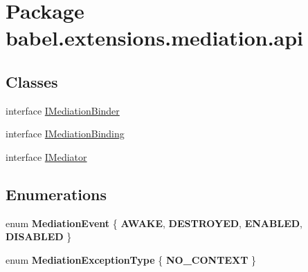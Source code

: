 \hypertarget{namespacebabel_1_1extensions_1_1mediation_1_1api}{\section{Package babel.\-extensions.\-mediation.\-api}
\label{namespacebabel_1_1extensions_1_1mediation_1_1api}
}
\subsection*{Classes}
\begin{DoxyCompactItemize}
\item 
interface \hyperlink{interfacebabel_1_1extensions_1_1mediation_1_1api_1_1_i_mediation_binder}{I\-Mediation\-Binder}
\item 
interface \hyperlink{interfacebabel_1_1extensions_1_1mediation_1_1api_1_1_i_mediation_binding}{I\-Mediation\-Binding}
\item 
interface \hyperlink{interfacebabel_1_1extensions_1_1mediation_1_1api_1_1_i_mediator}{I\-Mediator}
\end{DoxyCompactItemize}
\subsection*{Enumerations}
\begin{DoxyCompactItemize}
\item 
enum {\bfseries Mediation\-Event} \{ {\bfseries A\-W\-A\-K\-E}, 
{\bfseries D\-E\-S\-T\-R\-O\-Y\-E\-D}, 
{\bfseries E\-N\-A\-B\-L\-E\-D}, 
{\bfseries D\-I\-S\-A\-B\-L\-E\-D}
 \}
\item 
enum {\bfseries Mediation\-Exception\-Type} \{ {\bfseries N\-O\-\_\-\-C\-O\-N\-T\-E\-X\-T}
 \}
\end{DoxyCompactItemize}
